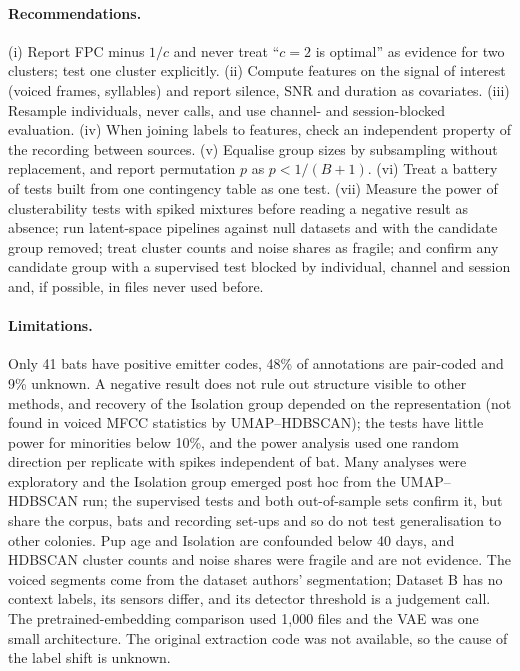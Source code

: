 \paragraph{Recommendations.} (i) Report FPC minus $1/c$ and never treat ``$c=2$ is optimal'' as evidence for two clusters; test one cluster explicitly. (ii) Compute features on the signal of interest (voiced frames, syllables) and report silence, SNR and duration as covariates. (iii) Resample individuals, never calls, and use channel- and session-blocked evaluation. (iv) When joining labels to features, check an independent property of the recording between sources. (v) Equalise group sizes by subsampling without replacement, and report permutation $p$ as $p<1/(B+1)$. (vi) Treat a battery of tests built from one contingency table as one test. (vii) Measure the power of clusterability tests with spiked mixtures before reading a negative result as absence; run latent-space pipelines against null datasets and with the candidate group removed; treat cluster counts and noise shares as fragile; and confirm any candidate group with a supervised test blocked by individual, channel and session and, if possible, in files never used before.

\paragraph{Limitations.} Only 41 bats have positive emitter codes, 48\% of annotations are pair-coded and 9\% unknown. A negative result does not rule out structure visible to other methods, and recovery of the Isolation group depended on the representation (not found in voiced MFCC statistics by UMAP--HDBSCAN); the tests have little power for minorities below 10\%, and the power analysis used one random direction per replicate with spikes independent of bat. Many analyses were exploratory and the Isolation group emerged post hoc from the UMAP--HDBSCAN run; the supervised tests and both out-of-sample sets confirm it, but share the corpus, bats and recording set-ups and so do not test generalisation to other colonies. Pup age and Isolation are confounded below 40 days, and HDBSCAN cluster counts and noise shares were fragile and are not evidence. The voiced segments come from the dataset authors' segmentation; Dataset B has no context labels, its sensors differ, and its detector threshold is a judgement call. The pretrained-embedding comparison used 1,000 files and the VAE was one small architecture. The original extraction code was not available, so the cause of the label shift is unknown.


